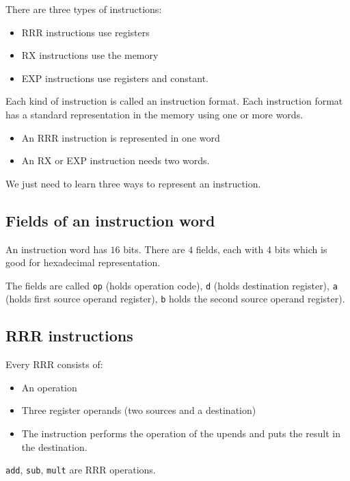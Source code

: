 There are three types of instructions:
\begin{itemize}
	\item RRR instructions use registers
	\item RX instructions use the memory
	\item EXP instructions use registers and constant.
\end{itemize}

%
Each kind of instruction is called an instruction format.
Each instruction format has a standard representation in the memory using one or more words.
\begin{itemize}
	\item An RRR instruction is represented in one word
	\item An RX or EXP instruction needs two words.
\end{itemize}
%
We just need to learn three ways to represent an instruction.

\subsection{Fields of an instruction word}\label{sub:fields_of_an_instruction_word}

An instruction word has \(16\) bits.
There are \(4\) fields, each with \(4\) bits which is good for hexadecimal representation.

The fields are called \texttt{op} (holds operation code), \texttt{d} (holds destination register), \texttt{a} (holds first source operand register), \texttt{b} holds the second source operand register).

\subsection{RRR instructions}\label{sub:rrr_instructions}

Every RRR consists of:
\begin{itemize}
	\item An operation
	\item Three register operands (two sources and a destination)
	\item The instruction performs the operation of the upends and puts the result in the destination.
\end{itemize}

\texttt{add}, \texttt{sub}, \texttt{mult} are RRR operations.

